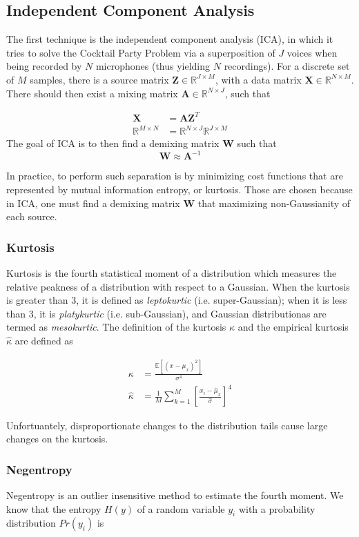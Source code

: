 \subsection{Independent Component Analysis}
The first technique is the independent component analysis (ICA), in which it tries to solve the Cocktail Party Problem via a superposition of $J$ voices when being recorded by $N$ microphones (thus yielding $N$ recordings). For a discrete set of $M$ samples, there is a source matrix $\bm{Z} \in \mathbb{R}^{J \times M}$, with a data matrix $\bm{X} \in \mathbb{R}^{N\times M}$. There should then exist a mixing matrix $\bm{A} \in \mathbb{R}^{N\times J}$, such that

\begin{align*}
    \bm{X} &= \bm{AZ}^T \\
    \mathbb{R}^{M\times N} &= \mathbb{R}^{N\times J} \mathbb{R}^{J\times M}
\end{align*}
The goal of ICA is to then find a demixing matrix $\bm{W}$ such that
$$\bm{W} \approx \bm{A}^{-1}$$

In practice, to perform such separation is by minimizing cost functions that are represented by mutual information entropy, or kurtosis. Those are chosen because in ICA, one must find a demixing matrix $\bm{W}$ that maximizing non-Gaussianity of each source.

\subsubsection{Kurtosis}
Kurtosis is the fourth statistical moment of a distribution which measures the relative peakness of a distribution with respect to a Gaussian. When the kurtosis is greater than 3, it is defined as \textit{leptokurtic} (i.e. super-Gaussian); when it is less than 3, it is \textit{platykurtic} (i.e. sub-Gaussian), and Gaussian distributionas are termed as \textit{mesokurtic}. The definition of the kurtosis $\kappa$ and the empirical kurtosis $\hat{\kappa}$ are defined as

\begin{align*}
    \kappa &= \frac{\mathbb{E}[(x-\mu_x)^2]}{\sigma^4} \\
    \hat{\kappa} &= \frac{1}{M} \sum_{k=1}^{M} \left[ \frac{x_i - \hat{\mu}_x}{\hat{\sigma}}\right]^4
\end{align*}

Unfortuantely, disproportionate changes to the distribution tails cause large changes on the kurtosis.

\subsubsection{Negentropy}
Negentropy is an outlier insensitive method to estimate the fourth moment. We know that the entropy $H(y)$ of a random variable $y_i$ with a probability distribution $Pr(y_i)$ is

